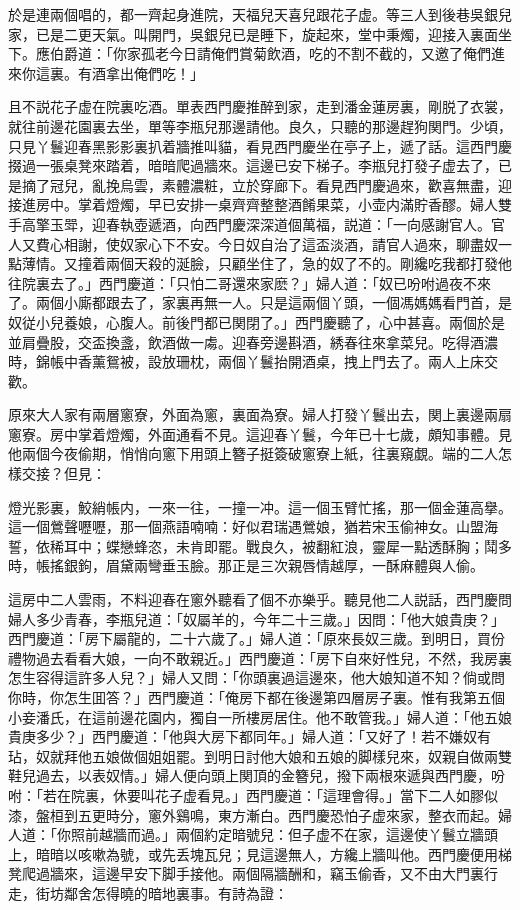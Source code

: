 於是連兩個唱的，都一齊起身進院，天福兒天喜兒跟花子虚。等三人到後巷吳銀兒家，已是二更天氣。叫開門，吳銀兒已是睡下，旋起來，堂中秉燭，迎接入裏面坐下。應伯爵道：「你家孤老今日請俺們賞菊飲酒，吃的不割不截的，又邀了俺們進來你這裏。有酒拿出俺們吃！」

且不説花子虚在院裏吃酒。單表西門慶推醉到家，走到潘金蓮房裏，剛脱了衣裳，就往前邊花園裏去坐，單等李瓶兒那邊請他。良久，只聽的那邊趕狗関門。少頃，只見丫鬟迎春黑影影裏扒着牆推叫貓，看見西門慶坐在亭子上，遞了話。這西門慶掇過一張桌凳來踏着，暗暗爬過牆來。這邊已安下梯子。李瓶兒打發子虚去了，已是摘了冠兒，亂挽烏雲，素體濃粧，立於穿廊下。看見西門慶過來，歡喜無盡，迎接進房中。掌着燈燭，早已安排一桌齊齊整整酒餚果菜，小壶内滿貯香醪。婦人雙手高擎玉斝，迎春執壺遞酒，向西門慶深深道個萬福，説道：「一向感謝官人。官人又費心相謝，使奴家心下不安。今日奴自治了這盃淡酒，請官人過來，聊盡奴一點薄情。又撞着兩個天殺的涎臉，只顧坐住了，急的奴了不的。剛纔吃我都打發他往院裏去了。」西門慶道：「只怕二哥還來家麽？」婦人道：「奴已吩咐過夜不來了。兩個小廝都跟去了，家裏再無一人。只是這兩個丫頭，一個馮媽媽看門首，是奴従小兒養娘，心腹人。前後門都已関閉了。」西門慶聽了，心中甚喜。兩個於是並肩疊股，交盃換盞，飲酒做一䖏。迎春旁邊斟酒，綉春往來拿菜兒。吃得酒濃時，錦帳中香薰鴛被，設放珊枕，兩個丫鬟抬開酒桌，拽上門去了。兩人上床交歡。

原來大人家有兩層窻寮，外面為窻，裏面為寮。婦人打發丫鬟出去，関上裏邊兩扇窻寮。房中掌着燈燭，外面通看不見。這迎春丫鬟，今年已十七歲，頗知事體。見他兩個今夜偷期，悄悄向窻下用頭上簪子挺簽破窻寮上紙，往裏窺覷。端的二人怎樣交接？但見：

\begin{myquote}
燈光影裏，鮫綃帳内，一來一往，一撞一冲。這一個玉臂忙搖，那一個金蓮高擧。這一個鶯聲嚦嚦，那一個燕語喃喃：好似君瑞遇鶯娘，猶若宋玉偷神女。山盟海誓，依稀耳中；蝶戀蜂恣，未肯即罷。戰良久，被翻紅浪，靈犀一點透酥胸；鬦多時，帳搖銀鉤，眉黛兩彎垂玉臉。那正是三次親唇情越厚，一酥麻體與人偷。
\end{myquote}

這房中二人雲雨，不料迎春在窻外聽看了個不亦樂乎。聽見他二人説話，西門慶問婦人多少青春，李瓶兒道：「奴屬羊的，今年二十三歲。」因問：「他大娘貴庚？」西門慶道：「房下屬龍的，二十六歲了。」婦人道：「原來長奴三歲。到明日，買份禮物過去看看大娘，一向不敢親近。」西門慶道：「房下自來好性兒，不然，我房裏怎生容得這許多人兒？」婦人又問：「你頭裏過這邊來，他大娘知道不知？倘或問你時，你怎生囬答？」西門慶道：「俺房下都在後邊第四層房子裏。惟有我第五個小妾潘氏，在這前邊花園内，獨自一所樓房居住。他不敢管我。」婦人道：「他五娘貴庚多少？」西門慶道：「他與大房下都同年。」婦人道：「又好了！若不嫌奴有玷，奴就拜他五娘做個姐姐罷。到明日討他大娘和五娘的脚樣兒來，奴親自做兩雙鞋兒過去，以表奴情。」婦人便向頭上関頂的金簪兒，撥下兩根來遞與西門慶，吩咐：「若在院裏，休要叫花子虚看見。」西門慶道：「這理會得。」當下二人如膠似漆，盤桓到五更時分，窻外鷄鳴，東方漸白。西門慶恐怕子虚來家，整衣而起。婦人道：「你照前越牆而過。」兩個約定暗號兒：但子虚不在家，這邊使丫鬟立牆頭上，暗暗以咳嗽為號，或先丢塊瓦兒；見這邊無人，方纔上牆叫他。西門慶便用梯凳爬過牆來，這邊早安下脚手接他。兩個隔牆酬和，竊玉偷香，又不由大門裏行走，街坊鄰舍怎得曉的暗地裏事。有詩為證：


